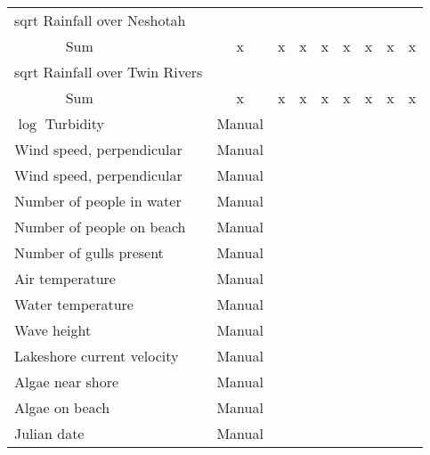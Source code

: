 \begin{table}
{\begin{minipage}{\textwidth}
\begin{tabular}{ll|cccccccc}
        \hline
        \multicolumn{2}{l|}{sqrt Rainfall over Neshotah} &&&&&&&& \\
        & Sum & x & x & x & x & x & x & x & x \\
        \hline
        \multicolumn{2}{l|}{sqrt Rainfall over Twin Rivers} &&&&&&&& \\
        & Sum & x & x & x & x & x & x & x & x \\
        \hline
        \multicolumn{2}{l|}{$\log$ Turbidity} & Manual&&&&&&& \\
        \hline
        \multicolumn{2}{l|}{Wind speed, perpendicular} & Manual&&&&&&& \\
        \hline
        \multicolumn{2}{l|}{Wind speed, perpendicular} & Manual&&&&&&& \\
        \hline
        \multicolumn{2}{l|}{Number of people in water} & Manual&&&&&&& \\
        \hline
        \multicolumn{2}{l|}{Number of people on beach} & Manual&&&&&&& \\
        \hline
        \multicolumn{2}{l|}{Number of gulls present} & Manual&&&&&&& \\
        \hline
        \multicolumn{2}{l|}{Air temperature} & Manual&&&&&&& \\
        \hline
        \multicolumn{2}{l|}{Water temperature} & Manual&&&&&&& \\
        \hline
        \multicolumn{2}{l|}{Wave height} & Manual&&&&&&& \\
        \hline
        \multicolumn{2}{l|}{Lakeshore current velocity} & Manual&&&&&&& \\
        \hline
        \multicolumn{2}{l|}{Algae near shore} & Manual&&&&&&& \\
        \hline
        \multicolumn{2}{l|}{Algae on beach} & Manual&&&&&&& \\
        \hline
        \multicolumn{2}{l|}{Julian date} & Manual&&&&&&& \\
        \hline
        \end{tabular}
        \end{minipage}}
\end{table}